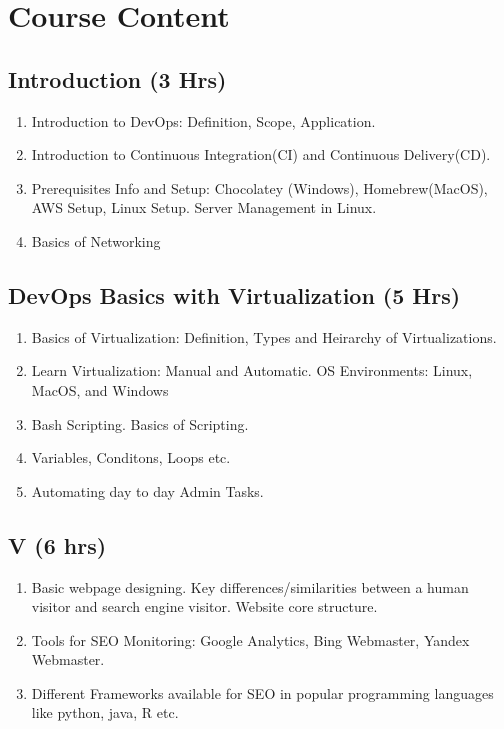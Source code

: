 \section{Course Content}
\noindent
\subsection{Introduction \hfill (3 Hrs)} 

\begin{enumerate}
    \item Introduction to DevOps: Definition, Scope, Application.
    \item Introduction to Continuous Integration(CI) and Continuous Delivery(CD).
    \item Prerequisites Info and Setup: Chocolatey (Windows), Homebrew(MacOS), AWS Setup, Linux Setup. Server Management in Linux. 
    \item Basics of Networking
\end{enumerate}

\subsection{DevOps Basics with Virtualization \hfill (5 Hrs)} 

\begin{enumerate}
    \item Basics of Virtualization: Definition, Types and Heirarchy of Virtualizations.
    \item Learn Virtualization: Manual and Automatic. OS Environments: Linux, MacOS, and Windows
    \item Bash Scripting. Basics of Scripting.
    \item Variables, Conditons, Loops etc. 
    \item Automating day to day Admin Tasks.
    
\end{enumerate}

\subsection{V \hfill (6 hrs)} 

\begin{enumerate}
    \item Basic webpage designing. Key differences/similarities between a human visitor and search engine visitor. Website core structure.
    \item Tools for SEO Monitoring: Google Analytics, Bing Webmaster, Yandex Webmaster. 
    \item Different Frameworks available for SEO in popular programming languages like python, java, R etc.
    
\end{enumerate}

